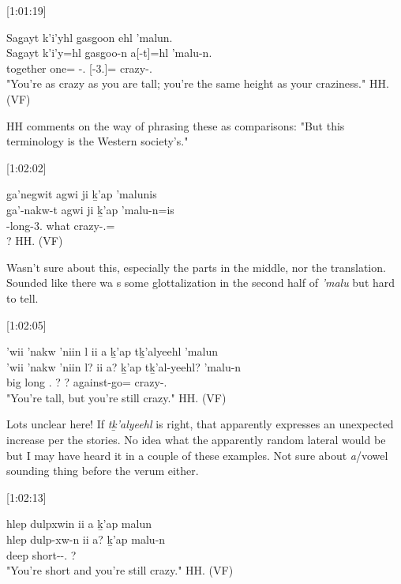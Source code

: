 [1:01:19]
\begin{exe}
    \ex \glll
    Sag̱ayt k’i’yhl g̱asg̱oon ehl ’malun. \\
    Sag̱ayt k’i’y=hl g̱asg̱oo-n a[-t]=hl ’malu-n. \\
    together one=\Cn{} \Mass-\Ssg.\Ii{} \Prep{}[-3.\Ii]=\Cn{} crazy-\Ssg.\Ii \\
    \glt "You're as crazy as you are tall; you're the same height as your craziness." \hfill HH.\ElicitationDate{} (VF)
\end{exe}

HH comments on the way of phrasing these as comparisons: "But this terminology is the Western society's."

[1:02:02]
\begin{exe}
    \ex \glll
    g̱a’negwit agwi ji ḵ’ap ’malunis  \\
    g̱a’-nakw-t agwi ji ḵ’ap ’malu-n=is  \\
    \Distr-long-3.\Ii{} what \Irr{} \Verum{} crazy-\Ssg.\Ii=\Qudd \\
    \glt ? \hfill HH.\ElicitationDate{} (VF)
\end{exe}

Wasn't sure about this, especially the parts in the middle, nor the translation.  Sounded like there wa s some glottalization in the second half of \textit{’malu} but hard to tell.

[1:02:05]
\begin{exe}
    \ex \glll
    ’wii ’nakw ’niin l ii a ḵ’ap tḵ’alyeehl 'malun \\
    ’wii ’nakw ’niin l? ii a? ḵ’ap tḵ’al-yeehl? 'malu-n \\
    big long \Ssg.\Iii{} ? \Ccnj{} \Prep? \Verum{} against-go=\Cn{} crazy-\Ssg.\Ii \\
    \glt "You're tall, but you're still crazy." \hfill HH.\ElicitationDate{} (VF)
\end{exe}

Lots unclear here! If \textit{tḵ’alyeehl} is right, that apparently expresses an unexpected increase per the stories. No idea what the apparently random lateral would be but I may have heard it in a couple of these examples. Not sure about \textit{a}/vowel sounding thing before the verum either.

[1:02:13]
\begin{exe}
    \ex \glll
    hlep dulpxwin ii a ḵ’ap malun \\
    hlep dulp-xw-n ii a? ḵ’ap malu-n \\
    deep short-\Val-\Ssg.\Ii{} \Ccnj{} \Prep? \Verum{} \\
    \glt "You're short and you're still crazy." \hfill HH.\ElicitationDate{} (VF)
\end{exe}

